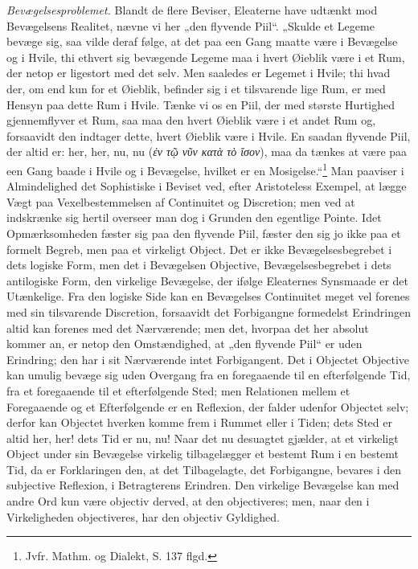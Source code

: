 \documentclass[11pt]{book}
\newcommand{\opage}[1]{\marginnote{\footnotesize\textit{[#1]}}}
\begin{document}
\emph{Bevægelsesproblemet.} Blandt de flere Beviser, Eleaterne have
udtænkt mod Bevægelsens Realitet, nævne vi her „den flyvende Piil“.
„Skulde et Legeme bevæge sig, saa vilde deraf følge, at det paa een
Gang maatte være i Bevægelse og i Hvile, thi ethvert sig bevægende
Legeme maa i hvert Øieblik være i et Rum, der netop er ligestort med
det selv. Men saaledes er Legemet i Hvile; thi hvad der, om end kun
for et Øieblik, befinder sig i et tilsvarende lige Rum, er med Hensyn
paa dette Rum i Hvile. Tænke vi os en Piil, der med største Hurtighed
gjennemflyver et Rum, saa
\opage{173} \setcounter{footnote}{0}%
maa den hvert Øieblik være i et andet Rum og, forsaavidt den indtager
dette, hvert Øieblik være i Hvile. En saadan flyvende Piil, der altid
er: her, her, nu, nu (\textit{ἐν τῷ νῦν κατὰ τὸ ἴσον}), maa da tænkes
at være paa een Gang baade i Hvile og i Bevægelse, hvilket er en
Mosigelse.“\footnote{Jvfr. Mathm. og Dialekt, S. 137 flgd.} %
Man paaviser i Almindelighed det Sophistiske i Beviset ved, efter
Aristoteless Exempel, at lægge Vægt paa Vexelbestemmelsen af
Continuitet og Discretion; men ved at indskrænke sig hertil overseer
man dog i Grunden den egentlige Pointe. Idet Opmærksomheden fæster sig
paa den flyvende Piil, fæster den sig jo ikke paa et formelt Begreb,
men paa et virkeligt Object. Det er ikke Bevægelsesbegrebet i dets
logiske Form, men det i Bevægelsen Objective, Bevægelsesbegrebet i
dets antilogiske Form, den virkelige Bevægelse, der ifølge Eleaternes
Synsmaade er det Utænkelige. Fra den logiske Side kan en Bevægelses
Continuitet meget vel forenes med sin tilsvarende Discretion,
forsaavidt det Forbigangne formedelst Erindringen altid kan forenes
med det Nærværende; men det, hvorpaa det her absolut kommer an, er
netop den Omstændighed, at „den flyvende Piil“ er uden Erindring; den
har i sit Nærværende intet Forbigangent. Det i Objectet Objective kan
umulig bevæge sig uden Overgang fra en foregaaende til en
efterfølgende Tid, fra et foregaaende til et efterfølgende Sted; men
Relationen mellem et Foregaaende og et Efterfølgende er en Reflexion,
der falder udenfor Objectet selv; derfor kan Objectet hverken komme
frem i Rummet eller i Tiden; dets Sted er altid her, her! dets Tid er
nu, nu! Naar det nu desuagtet gjælder, at et virkeligt Object under
sin Bevægelse virkelig tilbagelægger et bestemt Rum i en bestemt Tid,
da er Forklaringen den, at det Tilbagelagte, det Forbigangne, bevares
i den subjective Reflexion, i Betragterens Erindren. Den virkelige
Bevægelse kan med andre Ord
\opage{174} \setcounter{footnote}{0}%
kun være objectiv derved, at den objectiveres; men, naar den i
Virkeligheden objectiveres, har den objectiv Gyldighed.
\end{document}
